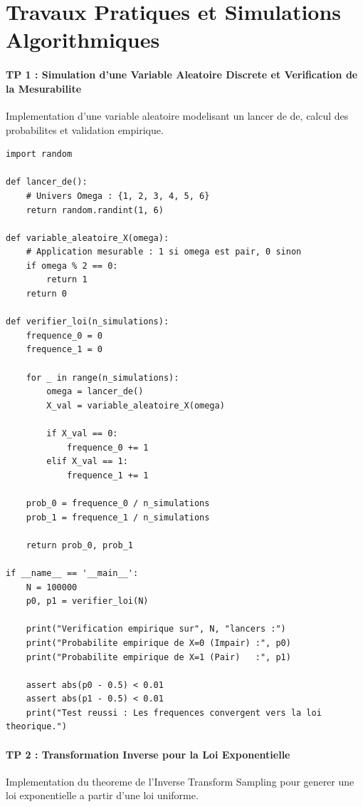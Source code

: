 \documentclass[11pt,a4paper]{article}
\begin{document}
\newpage
\part{Travaux Pratiques et Simulations Algorithmiques}
\subsection*{TP 1 : Simulation d'une Variable Aleatoire Discrete et Verification de la Mesurabilite}

Implementation d'une variable aleatoire modelisant un lancer de de, calcul des probabilites et validation empirique.

\begin{lstlisting}
import random

def lancer_de():
    # Univers Omega : {1, 2, 3, 4, 5, 6}
    return random.randint(1, 6)

def variable_aleatoire_X(omega):
    # Application mesurable : 1 si omega est pair, 0 sinon
    if omega % 2 == 0:
        return 1
    return 0

def verifier_loi(n_simulations):
    frequence_0 = 0
    frequence_1 = 0

    for _ in range(n_simulations):
        omega = lancer_de()
        X_val = variable_aleatoire_X(omega)

        if X_val == 0:
            frequence_0 += 1
        elif X_val == 1:
            frequence_1 += 1

    prob_0 = frequence_0 / n_simulations
    prob_1 = frequence_1 / n_simulations

    return prob_0, prob_1

if __name__ == '__main__':
    N = 100000
    p0, p1 = verifier_loi(N)

    print("Verification empirique sur", N, "lancers :")
    print("Probabilite empirique de X=0 (Impair) :", p0)
    print("Probabilite empirique de X=1 (Pair)   :", p1)

    assert abs(p0 - 0.5) < 0.01
    assert abs(p1 - 0.5) < 0.01
    print("Test reussi : Les frequences convergent vers la loi theorique.")

\end{lstlisting}


\subsection*{TP 2 : Transformation Inverse pour la Loi Exponentielle}

Implementation du theoreme de l'Inverse Transform Sampling pour generer une loi exponentielle a partir d'une loi uniforme.
\end{document}
